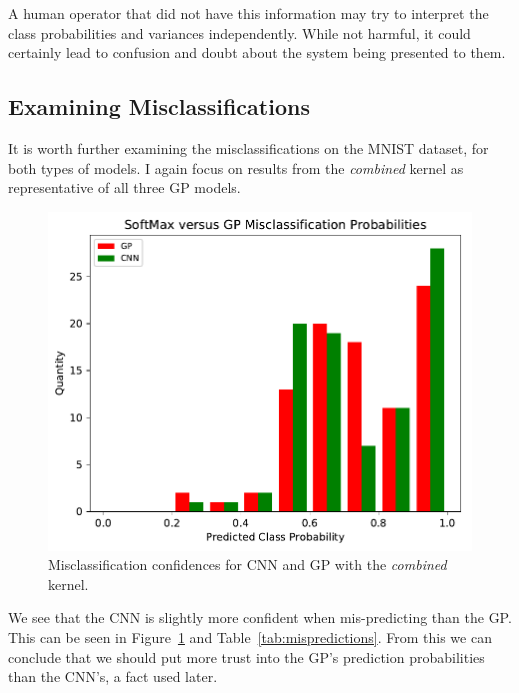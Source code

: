 \documentclass{article}
\begin{document}
A human operator that did not have this information may try to interpret the class probabilities and variances independently. While not harmful, it could certainly lead to confusion and doubt about the system being presented to them.


\subsection{Examining Misclassifications}

It is worth further examining the misclassifications on the MNIST dataset, for both types of models. I again focus on results from the \textit{combined} kernel as representative of all three GP models.

\begin{figure}[hbt]
\centering
\includegraphics[width=\hsize]{figures/mnist/cnn_vs_gp_misclassification_prob_combined.pdf}
\caption{Misclassification confidences for CNN and GP with the \textit{combined} kernel.}
\label{fig:mispredictions}
\end{figure}


We see that the CNN is slightly more confident when mis-predicting than the GP. This can be seen in Figure~\ref{fig:mispredictions} and Table~\ref{tab:mispredictions}. From this we can conclude that we should put more trust into the GP's prediction probabilities than the CNN's, a fact used later.
\end{document}
